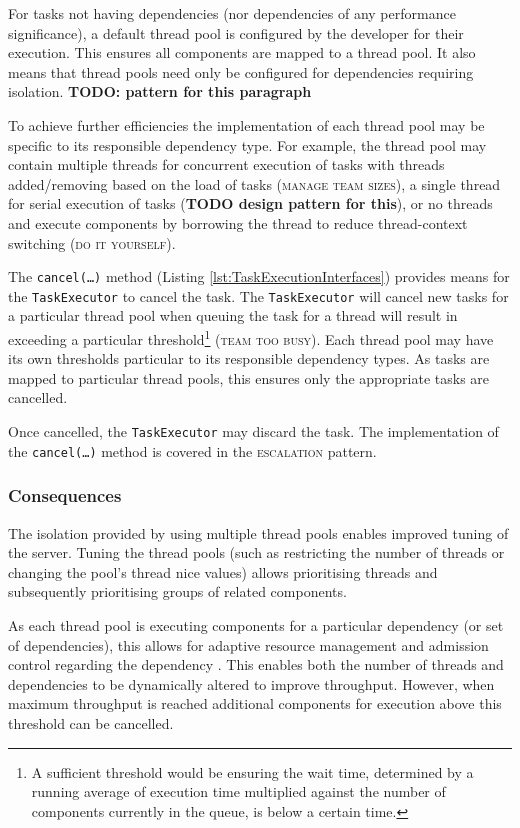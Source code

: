 \documentclass[prodmode]{style/acmlarge}
\begin{document}
For tasks not having dependencies (nor dependencies of any performance
significance), a default thread pool is configured by the developer for their
execution.  This ensures all components are mapped to a thread pool.  It also
means that thread pools need only be configured for dependencies requiring
isolation. \textbf{TODO: pattern for this paragraph}

To achieve further efficiencies the implementation of each thread pool may be
specific to its responsible dependency type.  For example, the thread pool may
contain multiple threads for concurrent execution of tasks with threads
added/removing based on the load of tasks (\textsc{manage team sizes}), a single
thread for serial execution of tasks (\textbf{TODO design pattern for this}), or
no threads and execute components by borrowing the thread to reduce
thread-context switching (\textsc{do it yourself}).

The \texttt{cancel(\ldots)} method (Listing \ref{lst:TaskExecutionInterfaces})
provides means for the \texttt{TaskExecutor} to cancel the task.
The \texttt{TaskExecutor} will cancel new tasks for a particular thread pool
when queuing the task for a thread will result in exceeding a particular
threshold\footnote{A sufficient threshold would be ensuring the wait time,
determined by a running average of execution time multiplied against the number
of components currently in the queue, is below a certain time.} (\textsc{team
too busy}).  Each thread pool may have its own thresholds particular to its
responsible dependency types.  As tasks are mapped to particular thread pools,
this ensures only the appropriate tasks are cancelled.

Once cancelled, the \texttt{TaskExecutor} may discard the task.  The
implementation of the \texttt{can\-cel(\ldots)} method is covered in the
\textsc{escalation} pattern.


\subsubsection*{Consequences}

The isolation provided by using multiple thread pools enables improved tuning of
the server.  Tuning the thread pools (such as restricting the number of threads
or changing the pool's thread nice values) allows prioritising threads and
subsequently prioritising groups of related components.

As each thread pool is executing components for a particular dependency (or set
of dependencies), this allows for adaptive resource management and admission
control regarding the dependency \cite{seda}.  This enables both the number of
threads and dependencies to be dynamically altered to improve throughput.
However, when maximum throughput is reached additional components for execution
above this threshold can be cancelled.
\end{document}
